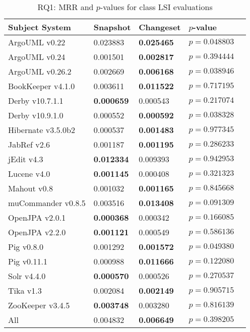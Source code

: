 
\begin{table}[t]
\renewcommand{\arraystretch}{1.3}
\footnotesize
\centering
\caption{RQ1: MRR and $p$-values for class LSI evaluations}
\begin{tabular}{l|ll|ll}
   \toprule
    Subject System & Snapshot        & Changeset       & $p$-value      \\
    \midrule

ArgoUML v0.22      & 0.023883        & {\bf 0.025465 } & $p = 0.048803$ \\
ArgoUML v0.24      & 0.001501        & {\bf 0.002817 } & $p = 0.394444$ \\
ArgoUML v0.26.2    & 0.002669        & {\bf 0.006168 } & $p = 0.038946$ \\
BookKeeper v4.1.0  & 0.003611        & {\bf 0.011522 } & $p = 0.717195$ \\
Derby v10.7.1.1    & {\bf 0.000659 } & 0.000543        & $p = 0.217074$ \\
Derby v10.9.1.0    & 0.000552        & {\bf 0.000592 } & $p = 0.038328$ \\
Hibernate v3.5.0b2 & 0.000537        & {\bf 0.001483 } & $p = 0.977345$ \\
JabRef v2.6        & 0.001187        & {\bf 0.001195 } & $p = 0.286233$ \\
jEdit v4.3         & {\bf 0.012334 } & 0.009393        & $p = 0.942953$ \\
Lucene v4.0        & {\bf 0.001145 } & 0.000408        & $p = 0.321323$ \\
Mahout v0.8        & 0.001032        & {\bf 0.001165 } & $p = 0.845668$ \\
muCommander v0.8.5 & 0.003516        & {\bf 0.013408 } & $p = 0.091309$ \\
OpenJPA v2.0.1     & {\bf 0.000368 } & 0.000342        & $p = 0.166085$ \\
OpenJPA v2.2.0     & {\bf 0.001121 } & 0.000549        & $p = 0.586136$ \\
Pig v0.8.0         & 0.001292        & {\bf 0.001572 } & $p = 0.049380$ \\
Pig v0.11.1        & 0.000988        & {\bf 0.011666 } & $p = 0.122080$ \\
Solr v4.4.0        & {\bf 0.000570 } & 0.000526        & $p = 0.270537$ \\
Tika v1.3          & 0.002084        & {\bf 0.002149 } & $p = 0.905715$ \\
ZooKeeper v3.4.5   & {\bf 0.003748 } & 0.003280        & $p = 0.816139$ \\
\midrule
All                & 0.004832        & {\bf 0.006649 } & $p = 0.398205$ \\

    \bottomrule
\end{tabular}
\label{table:rq1:class:lsi}
\end{table}

